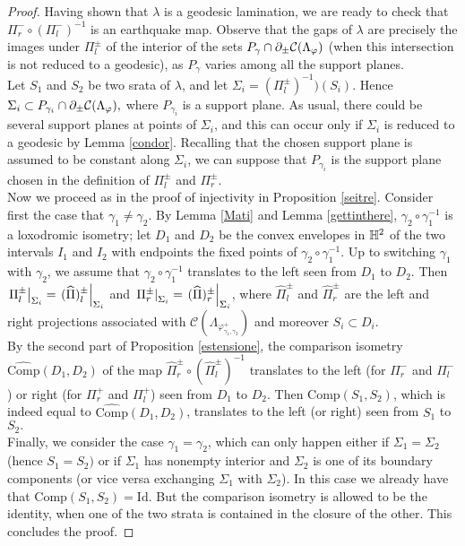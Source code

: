 \begin{proof}
    Having shown that $\lambda$ is a geodesic lamination, we are ready to check that $\Pi_r^-\circ(\Pi_l^-)^{-1}$ is an earthquake map. Observe that the gaps of $\lambda$ are precisely the images under $\Pi_l^\pm$ of the interior of the sets $P_\gamma\cap\partial_\pm\mathcal{C}(\Lambda_\varphi)$ (when this intersection is not reduced to a geodesic), as $P_\gamma$ varies among all the support planes. \\
    Let $S_1$ and $S_2$ be two srata of $\lambda$, and let $\Sigma_i=(\Pi_l^\pm)^{-1})(S_i).$ Hence $\Sigma_i\subset P_{\gamma_i}\cap\partial_\pm\mathcal{C}(\Lambda_\varphi),$ where $P_{\gamma_i}$ is a support plane. As usual, there could be several support planes at points of $\Sigma_i$, and this can occur only if $\Sigma_i$ is reduced to a geodesic by Lemma \ref{condor}. Recalling that the chosen support plane is assumed to be constant along $\Sigma_i$, we can suppose that $P_{\gamma_i}$ is the support plane chosen in the definition of $\Pi_l^\pm$ and $\Pi_r^\pm$.\\
    Now we proceed as in the proof of injectivity in Proposition \ref{seitre}. Consider first the case that $\gamma_1\neq\gamma_2$. By Lemma \ref{Mati} and Lemma \ref{gettinthere}, $\gamma_2\circ\gamma_1^{-1}$ is a loxodromic isometry; let $D_1$ and $D_2$ be the convex envelopes in $\mathbb{H}^2$ of the two intervals $I_1$ and $I_2$ with endpoints the fixed points of $\gamma_2\circ\gamma_1^{-1}.$ Up to switching $\gamma_1$ with $\gamma_2$, we assume that $\gamma_2\circ\gamma_1^{-1}$ translates to the left seen from $D_1$ to $D_2$. Then $\left.\Pi_l^\pm\right|_{\Sigma_i}=\left.(\widehat{\Pi})_l^\pm\right|_{\Sigma_i}$ and $\left.\Pi_r^\pm\right|_{\Sigma_i}=\left.(\widehat{\Pi})_r^\pm\right|_{\Sigma_i}$, where $\widehat{\Pi}_l^\pm$ and $\widehat{\Pi}_r^\pm$ are the left and right projections associated with $\mathcal{C}(\Lambda_{\varphi_{\gamma_1,\gamma_2}^+})$ and moreover $S_i\subset D_i$.\\
    By the second part of Proposition \ref{estensione}, the comparison isometry $\widehat{\text{Comp}}(D_1,D_2)$ of the map $\widehat{\Pi}_r^\pm\circ(\widehat{\Pi}_l^\pm)^{-1}$ translates to the left (for $\Pi_r^-$ and $\Pi_l^-$) or right (for $\Pi_r^+$ and $\Pi_l^+$) seen from $D_1$ to $D_2$. Then $\text{Comp}(S_1,S_2)$, which is indeed equal to $\widehat{\text{Comp}}(D_1,D_2)$, translates to the left (or right) seen from $S_1$ to $S_2.$\\
    Finally, we consider the case $\gamma_1=\gamma_2$, which can only happen either if $\Sigma_1=\Sigma_2$ (hence $S_1=S_2)$ or if $\Sigma_1$ has nonempty interior and $\Sigma_2$ is one of its boundary components (or vice versa exchanging $\Sigma_1$ with $\Sigma_2$). In this case we already have that $\text{Comp}(S_1,S_2)=\text{Id}$. But the comparison isometry is allowed to be the identity, when one of the two strata is contained in the closure of the other. This concludes the proof. 
\end{proof}

